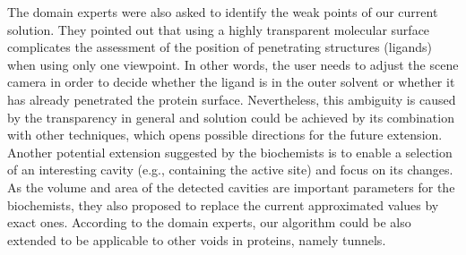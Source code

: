 The domain experts were also asked to identify the weak points of our current solution.
They pointed out that using a highly transparent molecular surface complicates the assessment of the position of penetrating structures (ligands) when using only one viewpoint.
In other words, the user needs to adjust the scene camera in order to decide whether the ligand is in the outer solvent or whether it has already penetrated the protein surface.
Nevertheless, this ambiguity is caused by the transparency in general and solution could be achieved by its combination with other techniques, which opens possible directions for the future extension.
Another potential extension suggested by the biochemists is to enable a selection of an interesting cavity (e.g., containing the active site) and focus on its changes.
As the volume and area of the detected cavities are important parameters for the biochemists, they also proposed to replace the current approximated values by exact ones.
According to the domain experts, our algorithm could be also extended to be applicable to other voids in proteins, namely tunnels.



